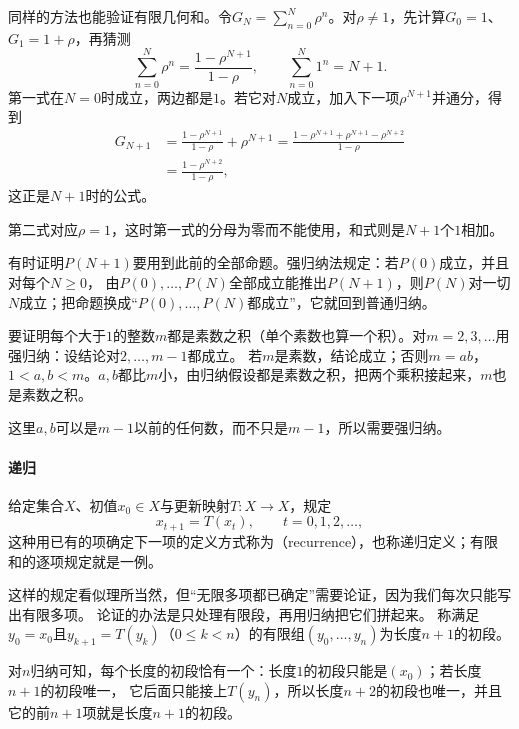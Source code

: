 同样的方法也能验证有限几何和。令$G_N=\sum_{n=0}^N\rho^n$。对$\rho\neq1$，先计算$G_0=1$、$G_1=1+\rho$，再猜测
\begin{equation}
 \sum_{n=0}^{N}\rho^n=\frac{1-\rho^{N+1}}{1-\rho},\qquad
 \sum_{n=0}^{N}1^n=N+1.
 \label{eq:prelim-finite-geometric-sum}
\end{equation}
第一式在$N=0$时成立，两边都是$1$。若它对$N$成立，加入下一项$\rho^{N+1}$并通分，得到
\[
 \begin{aligned}
  G_{N+1}&=\frac{1-\rho^{N+1}}{1-\rho}+\rho^{N+1}
  =\frac{1-\rho^{N+1}+\rho^{N+1}-\rho^{N+2}}{1-\rho}\\
  &=\frac{1-\rho^{N+2}}{1-\rho},
 \end{aligned}
\]
这正是$N+1$时的公式。

第二式对应$\rho=1$，这时第一式的分母为零而不能使用，和式则是$N+1$个$1$相加。

有时证明$P(N+1)$要用到此前的全部命题。强归纳法规定：若$P(0)$成立，并且对每个$N\geq0$，
由$P(0),\ldots,P(N)$全部成立能推出$P(N+1)$，则$P(N)$对一切$N$成立；把命题换成“$P(0),\ldots,P(N)$都成立”，它就回到普通归纳。
\begin{example}[整数分解为素数之积]
\label{ex:sets-strong-induction-primes}
要证明每个大于$1$的整数$m$都是素数之积（单个素数也算一个积）。对$m=2,3,\ldots$用强归纳：设结论对$2,\ldots,m-1$都成立。
若$m$是素数，结论成立；否则$m=ab$，$1<a,b<m$。$a,b$都比$m$小，由归纳假设都是素数之积，把两个乘积接起来，$m$也是素数之积。

这里$a,b$可以是$m-1$以前的任何数，而不只是$m-1$，所以需要强归纳。
\end{example}

\paragraph{递归}
给定集合$X$、初值$x_0\in X$与更新映射$T:X\to X$，规定
\begin{equation}
 x_{t+1}=T(x_t),\qquad t=0,1,2,\ldots,
 \label{eq:prelim-recurrence}
\end{equation}
这种用已有的项确定下一项的定义方式称为（recurrence），也称递归定义；有限和的逐项规定就是一例。

这样的规定看似理所当然，但“无限多项都已确定”需要论证，因为我们每次只能写出有限多项。
论证的办法是只处理有限段，再用归纳把它们拼起来。
称满足$y_0=x_0$且$y_{k+1}=T(y_k)$（$0\leq k<n$）的有限组$(y_0,\ldots,y_n)$为长度$n+1$的初段。

对$n$归纳可知，每个长度的初段恰有一个：长度$1$的初段只能是$(x_0)$；若长度$n+1$的初段唯一，
它后面只能接上$T(y_n)$，所以长度$n+2$的初段也唯一，并且它的前$n+1$项就是长度$n+1$的初段。

